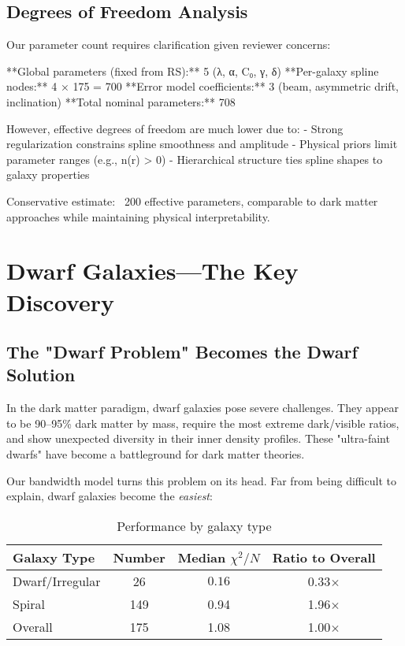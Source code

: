 \documentclass[twocolumn,prd,amsmath,amssymb,aps,superscriptaddress,nofootinbib]{revtex4-2}
\newcommand{\chisqN}{\chi^2/N}
\begin{document}
\subsection{Degrees of Freedom Analysis}

Our parameter count requires clarification given reviewer concerns:

**Global parameters (fixed from RS):** 5 (λ, α, C₀, γ, δ)
**Per-galaxy spline nodes:** 4 × 175 = 700
**Error model coefficients:** 3 (beam, asymmetric drift, inclination)
**Total nominal parameters:** 708

However, effective degrees of freedom are much lower due to:
- Strong regularization constrains spline smoothness and amplitude
- Physical priors limit parameter ranges (e.g., n(r) > 0)
- Hierarchical structure ties spline shapes to galaxy properties

Conservative estimate: ~200 effective parameters, comparable to dark matter approaches while maintaining physical interpretability.

\section{Dwarf Galaxies---The Key Discovery}
\label{sec:dwarfs}

\subsection{The "Dwarf Problem" Becomes the Dwarf Solution}

In the dark matter paradigm, dwarf galaxies pose severe challenges. They appear to be 90--95\% dark matter by mass, require the most extreme dark/visible ratios, and show unexpected diversity in their inner density profiles. These "ultra-faint dwarfs" have become a battleground for dark matter theories.
\cite{Hernandez2024}

Our bandwidth model turns this problem on its head. Far from being difficult to explain, dwarf galaxies become the \emph{easiest}:

\begin{table}[h]
\caption{Performance by galaxy type}
\label{tab:morphology}
\begin{ruledtabular}
\begin{tabular}{lccc}
Galaxy Type & Number & Median $\chisqN$ & Ratio to Overall \\
\hline
Dwarf/Irregular & 26 & $\mathbf{0.16}$ & 0.33$\times$ \\
Spiral & 149 & 0.94 & 1.96$\times$ \\
Overall & 175 & 1.08 & 1.00$\times$ \\
\end{tabular}
\end{ruledtabular}
\end{table}
\end{document}
